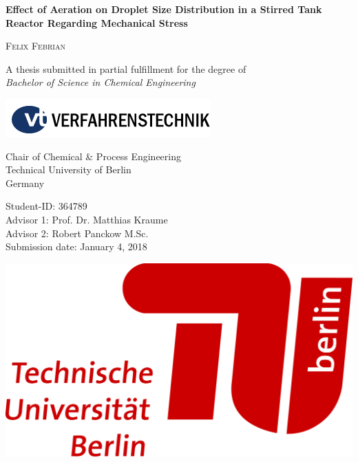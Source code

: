 \begin{titlepage}
\thispagestyle{empty}

\begin{center}
	\LARGE
	\textsf{\textbf{Effect of Aeration on Droplet Size Distribution in a Stirred Tank Reactor Regarding Mechanical Stress}} \\
    \vspace{2cm}
        
    \large
    \textsc{Felix Febrian}
	\vspace{5cm}

	\large
	A thesis submitted in partial fulfillment for the degree of \\
    \textit{Bachelor of Science in Chemical Engineering}
        
	\vspace{2cm}	
	\includegraphics[scale=1]{pictures/vt_logo.png}
 
	Chair of Chemical \& Process Engineering \\
	Technical University of Berlin \\
    Germany
\end{center}

\normalsize
\vfill
\noindent   \begin{minipage}{0.6\textwidth} %
Student-ID:			\tabto{4.0cm} 364789	\\
Advisor 1:			\tabto{4.0cm} Prof. Dr. Matthias Kraume \\
Advisor 2:			\tabto{4.0cm} Robert Panckow M.Sc. \\
Submission date:		\tabto{4.0cm} January 4, 2018
\end{minipage}
\begin{minipage}{0.3\textwidth}
    \hfill \includegraphics[scale=0.5]{pictures/TU_Logo_lang_4c_rot.png}
\end{minipage}

\end{titlepage}

